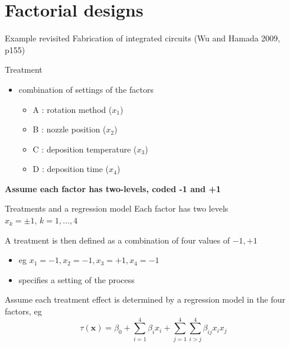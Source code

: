 \documentclass[
  ignorenonframetext,
]{beamer}
\providecommand{\tightlist}{%
  \setlength{\itemsep}{0pt}\setlength{\parskip}{0pt}}
\begin{document}
\hypertarget{factorial-designs}{%
\section{Factorial designs}\label{factorial-designs}}

\begin{frame}{Example revisited}
\protect\hypertarget{example-revisited}{}
Fabrication of integrated circuits (Wu and Hamada 2009, p155)

Treatment

\begin{itemize}
\tightlist
\item
  combination of settings of the factors

  \begin{itemize}
  \tightlist
  \item
    A : rotation method (\(x_1\))
  \item
    B : nozzle position (\(x_2\))
  \item
    C : deposition temperature (\(x_3\))
  \item
    D : deposition time (\(x_4\))
  \end{itemize}
\end{itemize}

\textbf{Assume each factor has two-levels, coded -1 and +1}
\end{frame}

\begin{frame}{Treatments and a regression model}
\protect\hypertarget{treatments-and-a-regression-model}{}
Each factor has two levels \(x_k = \pm 1,\, k=1,\ldots,4\)

A treatment is then defined as a combination of four values of
\(-1, +1\)

\begin{itemize}
\tightlist
\item
  eg \(x_1 = -1, x_2 = -1, x_3 = +1, x_4 = -1\)
\item
  specifies a setting of the process
\end{itemize}

Assume each treatment effect is determined by a regression model in the
four factors, eg \[
\tau(\boldsymbol{x}) = \beta_0 + \sum_{i=1}^4\beta_ix_i + \sum_{j=1}^4\sum_{i>j}^4\beta_{ij}x_ix_j
\]
\end{frame}
\end{document}
